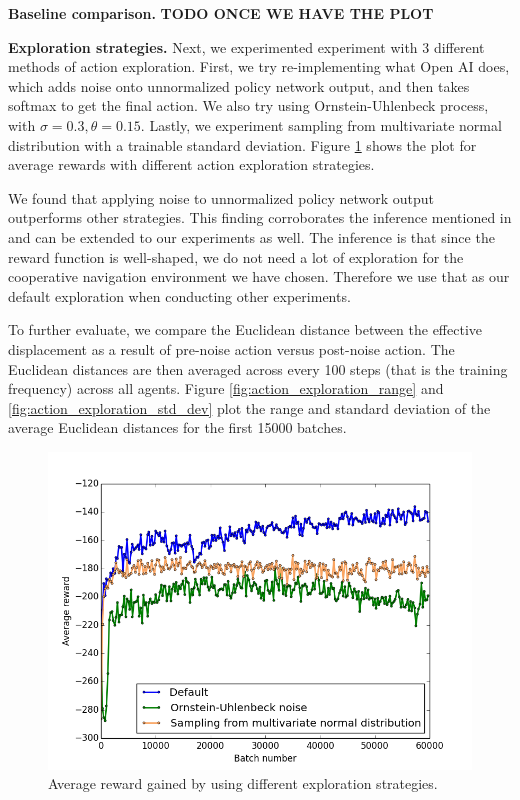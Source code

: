 \documentclass{article}
\begin{document}
\textbf{Baseline comparison.} \textbf{TODO ONCE WE HAVE THE PLOT}

\textbf{Exploration strategies.} Next, we experimented experiment with 3 different methods of action exploration. First, we try re-implementing what Open AI does, which adds noise onto unnormalized policy network output, and then takes softmax to get the final action. We also try using Ornstein-Uhlenbeck process, with $\sigma = 0.3, \theta = 0.15$. Lastly, we experiment sampling from multivariate normal distribution with a trainable standard deviation. Figure \ref{fig:defaultVSouVSdist} shows the plot for average rewards with different action exploration strategies.

We found that applying noise to unnormalized policy network output outperforms other strategies. This finding corroborates the inference mentioned in \cite{plappert2017parameter} and can be extended to our experiments as well. The inference is that since the reward function is well-shaped, we do not need a lot of exploration for the cooperative navigation environment we have chosen. Therefore we use that as our default exploration when conducting other experiments. 

To further evaluate, we compare the Euclidean distance between the effective displacement as a result of pre-noise action versus post-noise action. The Euclidean distances are then averaged across every 100 steps (that is the training frequency) across all agents. Figure \ref{fig:action_exploration_range} and \ref{fig:action_exploration_std_dev} plot the range and standard deviation of the average Euclidean distances for the first 15000 batches.

\begin{figure}
\begin{center}
\includegraphics[scale=0.4]{defaultVSouVSdist}
\end{center}
\caption{Average reward gained by using different exploration strategies.}
\label{fig:defaultVSouVSdist}
\end{figure}
\end{document}
